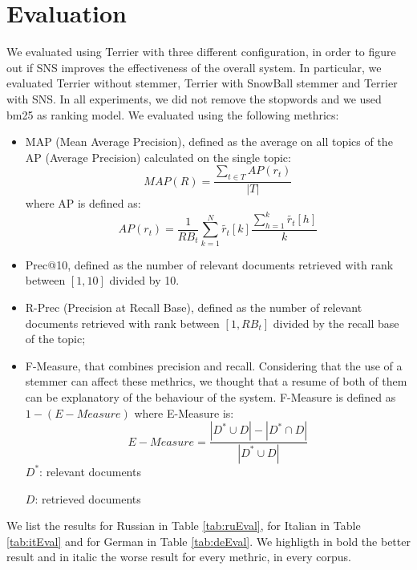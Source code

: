 \section{Evaluation}
We evaluated using Terrier\cite{terrier} with three different configuration, in order to figure out if SNS improves the effectiveness of the overall system. In particular, we evaluated Terrier without stemmer, Terrier with SnowBall\cite{snowball} stemmer and Terrier with SNS. In all experiments, we did not remove the stopwords and we used bm25 as ranking model. We evaluated using the following methrics:

\begin{itemize}
\item MAP (Mean Average Precision), defined as the average on all topics of the AP (Average Precision) calculated on the single topic:
\begin{equation}
MAP(R) = \frac{\sum_{t \in T}AP(r_t)}{|T|}
\end{equation}
where AP is defined as:
\begin{equation}
AP(r_t)=\frac{1}{RB_t}\sum_{k=1}^{N}\widetilde{r_t}[k]\frac{\sum_{h=1}^{k}\widetilde{r_t}[h]}{k}
\end{equation}

\item Prec@10, defined as the number of relevant documents retrieved with rank between $[1, 10]$ divided by 10.

\item R-Prec (Precision at Recall Base), defined as the number of relevant documents retrieved with rank between $[1,RB_t]$ divided by the recall base of the topic;

\item F-Measure, that combines precision and recall. Considering that the use of a stemmer can affect these methrics, we thought that a resume of both of them can be explanatory of the behaviour of the system. F-Measure is defined as $1 - (E-Measure)$ where E-Measure is:
\begin{equation}
E-Measure=\frac{|D^{*}\cup D|-|D^{*}\cap D|}{|D^{*}\cup D|}
\end{equation}
$D^{*}$: relevant documents

$D$: retrieved documents

\end{itemize}

We list the results for Russian in Table \ref{tab:ruEval}, for Italian in Table \ref{tab:itEval} and for German in Table \ref{tab:deEval}. We highligth in bold the better result and in italic the worse result for every methric, in every corpus.

